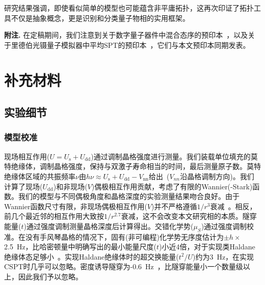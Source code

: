 \documentclass[preprint,superscriptaddress,floatfix, nofootinbib]{revtex4-2}
\begin{document}
研究结果强调，即使看似简单的模型也可能蕴含非平庸拓扑，这再次印证了拓扑工具不仅是抽象概念，更是识别和分类量子物相的实用框架。

\vspace{4pt}

\textbf{附注.} 在定稿期间，我们注意到关于数字量子器件中混合态序的预印本~\cite{Zhang2025}，以及关于里德伯光镊量子模拟器中平均SPT的预印本~\cite{Yue2025}，它们与本文预印本同期发表。
\section*{补充材料}


\subsection*{实验细节}


\subsubsection*{模型校准}

现场相互作用($U=U_\textrm{s}+U_\textrm{dd}$)通过调制晶格强度进行测量。我们装载单位填充的莫特绝缘体，调制晶格强度，保持与双激子寿命相当的时间，最后测量原子数。莫特绝缘体区域的共振频率$\nu$由$h\nu\approx U_\textrm{s}+U_\textrm{dd}-V_\textrm{nn}$给出~\cite{Chomaz2016}($V_{nn}$沿晶格调制方向)。我们计算了现场($U_\textrm{dd}$)和非现场($V$)偶极相互作用贡献，考虑了有限的Wannier(-Stark)函数。我们的模型与不同偶极角度和晶格深度的实验测量结果吻合良好。由于Wannier函数尺寸有限，非现场偶极相互作用($V$)并不严格遵循$1/r^3$衰减~\cite{Wall2013}。相反，前几个最近邻的相互作用大致按$1/r^{2.7}$衰减，这不会改变本文研究相的本质。隧穿能量($t$)通过强度调制测量晶格深度后计算得出。交错化学势($\mu_S$)通过强度调制校准。在没有手风琴晶格的情况下，固有(非可编程)化学势无序度估计为$\pm h\times$ 2.5~Hz，比哈密顿量中明确写出的最小能量尺度($t$)小近4倍，对于实现类Haldane绝缘体态足够小~\cite{Deng2013, Lv2018}。实现Haldane绝缘体时的超交换能量($t^2/U$)约为3~Hz，在实现CSPT时几乎可以忽略。密度诱导隧穿为-0.6~Hz~\cite{Baier2016}，比隧穿能量小一个数量级以上，因此我们予以忽略。
\end{document}
